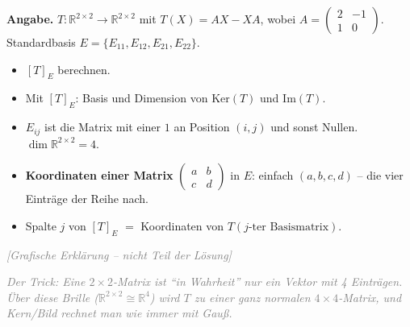 \documentclass[a4paper,12pt]{article}
\newcommand{\grafik}{\textcolor{gray}{\small\textit{[Grafische Erkl\"arung -- nicht Teil der L\"osung]}}}
\begin{document}
\textbf{Angabe.} $T \colon \mathbb{R}^{2\times 2} \to \mathbb{R}^{2\times 2}$ mit $T(X) = AX - XA$, wobei $A = \begin{pmatrix} 2 & -1 \\ 1 & 0 \end{pmatrix}$.
Standardbasis $E = \{E_{11}, E_{12}, E_{21}, E_{22}\}$.
\begin{itemize}[nosep]
\item[(a)] $[T]_E$ berechnen.
\item[(b)] Mit $[T]_E$: Basis und Dimension von $\text{Ker}(T)$ und $\text{Im}(T)$.
\end{itemize}

\begin{begriffe}
\begin{itemize}[leftmargin=*, nosep]
    \item $E_{ij}$ ist die Matrix mit einer $1$ an Position $(i,j)$ und sonst Nullen. $\dim \mathbb{R}^{2\times 2} = 4$.
    \item \textbf{Koordinaten einer Matrix} $\begin{pmatrix} a & b \\ c & d \end{pmatrix}$ in $E$: einfach $(a, b, c, d)$ -- die vier Eintr\"age der Reihe nach.
    \item Spalte $j$ von $[T]_E$ $=$ Koordinaten von $T(\text{$j$-ter Basismatrix})$.
\end{itemize}
\end{begriffe}

\grafik

\begin{center}
\end{center}

\textcolor{gray}{\small\textit{Der Trick: Eine $2\times 2$-Matrix ist ``in Wahrheit'' nur ein Vektor mit 4 Eintr\"agen. \"Uber diese Brille ($\mathbb{R}^{2\times2} \cong \mathbb{R}^4$) wird $T$ zu einer ganz normalen $4\times 4$-Matrix, und Kern/Bild rechnet man wie immer mit Gau\ss.}}
\end{document}
